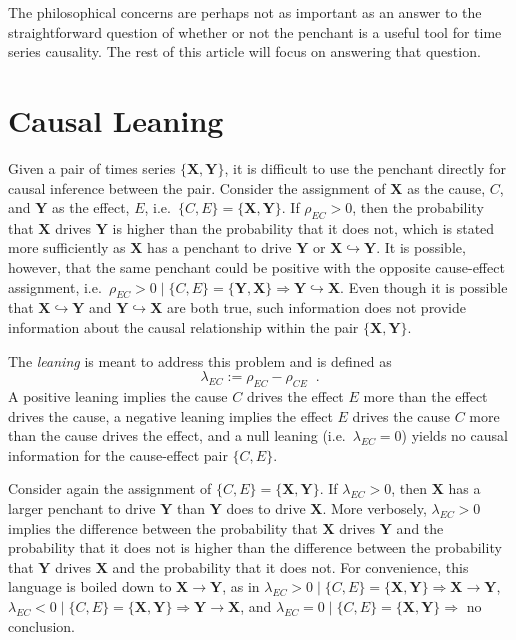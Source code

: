 \documentclass[a4paper,11pt,twocolumn]{article}
\begin{document}
The philosophical concerns are perhaps not as important as an answer to the straightforward question of whether or not the penchant is a useful tool for time series causality.  The rest of this article will focus on answering that question.

\section{Causal Leaning}
Given a pair of times series $\{\mathbf{X},\mathbf{Y}\}$, it is difficult to use the penchant directly for causal inference between the pair.  Consider the assignment of $\mathbf{X}$ as the cause, $C$, and $\mathbf{Y}$ as the effect, $E$, i.e.\ $\{C,E\}=\{\mathbf{X},\mathbf{Y}\}$.  If $\rho_{EC}>0$, then the probability that $\mathbf{X}$ drives $\mathbf{Y}$ is higher than the probability that it does not, which is stated more sufficiently as $\mathbf{X}$ has a penchant to drive $\mathbf{Y}$ or $\mathbf{X}\hookrightarrow\mathbf{Y}$.  It is possible, however, that the same penchant could be positive with the opposite cause-effect assignment, i.e.\ $\rho_{EC}>0\;|\; \{C,E\}=\{\mathbf{Y},\mathbf{X}\}\Rightarrow \mathbf{Y}\hookrightarrow\mathbf{X}$.  Even though it is possible that $\mathbf{X}\hookrightarrow\mathbf{Y}$ and $\mathbf{Y}\hookrightarrow\mathbf{X}$ are both true, such information does not provide information about the causal relationship within the pair $\{\mathbf{X},\mathbf{Y}\}$.  

The {\em leaning} is meant to address this problem and is defined as
\begin{equation}
\label{eq:leaning}
\lambda_{EC} := \rho_{EC} - \rho_{CE}\;\;.
\end{equation}
A positive leaning implies the cause $C$ drives the effect $E$ more than the effect drives the cause, a negative leaning implies the effect $E$ drives the cause $C$ more than the cause drives the effect, and a null leaning (i.e.\ $\lambda_{EC} = 0$) yields no causal information for the cause-effect pair $\{C,E\}$.  

Consider again the assignment of $\{C,E\}=\{\mathbf{X},\mathbf{Y}\}$.  If $\lambda_{EC}>0$, then $\mathbf{X}$ has a larger penchant to drive $\mathbf{Y}$ than $\mathbf{Y}$ does to drive $\mathbf{X}$.  More verbosely, $\lambda_{EC}>0$ implies the difference between the probability that $\mathbf{X}$ drives $\mathbf{Y}$ and the probability that it does not is higher than the difference between the probability that $\mathbf{Y}$ drives $\mathbf{X}$ and the probability that it does not.  For convenience, this language is boiled down to $\mathbf{X}\rightarrow\mathbf{Y}$, as in
$\lambda_{EC}>0\;|\; \{C,E\}=\{\mathbf{X},\mathbf{Y}\}\Rightarrow\mathbf{X}\rightarrow\mathbf{Y}$, $\lambda_{EC}<0\;|\; \{C,E\}=\{\mathbf{X},\mathbf{Y}\}\Rightarrow\mathbf{Y}\rightarrow\mathbf{X}$, and $\lambda_{EC}=0\;|\; \{C,E\}=\{\mathbf{X},\mathbf{Y}\}\Rightarrow$ no conclusion.
\end{document}
